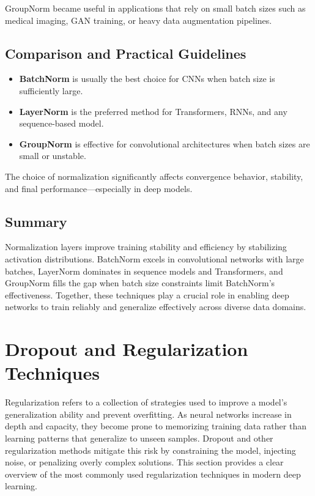 \documentclass[12pt,a4paper]{report}
\begin{document}
GroupNorm became useful in applications that rely on small batch sizes such as medical imaging, GAN training, or heavy data augmentation pipelines.

\vspace{1em}
\subsection{Comparison and Practical Guidelines}

\begin{itemize}
    \item \textbf{BatchNorm} is usually the best choice for CNNs when batch size is sufficiently large.
    \item \textbf{LayerNorm} is the preferred method for Transformers, RNNs, and any sequence-based model.
    \item \textbf{GroupNorm} is effective for convolutional architectures when batch sizes are small or unstable.
\end{itemize}

The choice of normalization significantly affects convergence behavior, stability, and final performance—especially in deep models.

\vspace{1em}
\subsection{Summary}

Normalization layers improve training stability and efficiency by stabilizing activation distributions.  
BatchNorm excels in convolutional networks with large batches, LayerNorm dominates in sequence models and Transformers, and GroupNorm fills the gap when batch size constraints limit BatchNorm’s effectiveness.  
Together, these techniques play a crucial role in enabling deep networks to train reliably and generalize effectively across diverse data domains.


\section{Dropout and Regularization Techniques}

Regularization refers to a collection of strategies used to improve a model’s generalization ability and prevent overfitting. 
As neural networks increase in depth and capacity, they become prone to memorizing training data rather than learning patterns that generalize to unseen samples.  
Dropout and other regularization methods mitigate this risk by constraining the model, injecting noise, or penalizing overly complex solutions.  
This section provides a clear overview of the most commonly used regularization techniques in modern deep learning.
\end{document}
